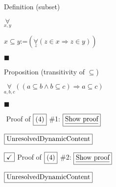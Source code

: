 \documentclass{article}
\newcommand{\mathsym}[1]{{}}
\begin{document}
Definition (subset)

\(\underset{x,y}{\forall }\)

\(x\subseteq y\text{:=}\left(\underset{z}{\forall }(z\in x\Rightarrow z\in y)\right)\)

$\blacksquare$





Proposition (transitivity of $\subseteq $)

\(\underset{a,b,c}{\forall }((a\subseteq b\land b\subseteq c)\Rightarrow a\subseteq c)\)

$\blacksquare$



\(\mathsym{\WarningSign}\) Proof of \(\fbox{$\text{(4)}$}\) $\#$1: { } \(\fbox{$\underline{\text{Show proof}}$}\)

\(\fbox{$\text{Unresolved} \text{Dynamic} \text{Content}$}\)

\(\fbox{\checkmark}\) Proof of \(\fbox{$\text{(4)}$}\) $\#$2: { } \(\fbox{$\underline{\text{Show proof}}$}\)

\(\fbox{$\text{Unresolved} \text{Dynamic} \text{Content}$}\)
\end{document}
